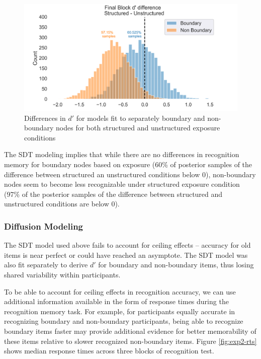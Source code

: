 \begin{figure}
    \centering
    \includegraphics[width = \textwidth]{chapter_notebooks/chapter_3/figures/sdt_d_results.png}
    \caption{Differences in $d'$ for models fit to separately boundary and non-boundary nodes for both structured and unstructured exposure conditions}
    \label{fig:sdt-params}
\end{figure}

The SDT modeling implies that while there are no differences in recognition memory for boundary nodes based on exposure (60\% of posterior samples of the difference between structured an unstructured conditions below 0), non-boundary nodes seem to become less recognizable under structured exposure condition (97\% of the posterior samples of the difference between structured and unstructured conditions are below 0). 

\subsubsection*{Diffusion Modeling}
The SDT model used above fails to account for ceiling effects -- accuracy for old items is near perfect or could have reached an asymptote. The SDT model was also fit separately to derive $d'$ for boundary and non-boundary items, thus losing shared variability within participants.

To be able to account for ceiling effects in recognition accuracy, we can use additional information available in the form of response times during the recognition memory task. For example, for participants equally accurate in recognizing boundary and non-boundary participants, being able to recognize boundary items faster may provide additional evidence for better memorability of these items relative to slower recognized non-boundary items. Figure \ref{fig:exp2-rts} shows median response times across three blocks of recognition test. 

